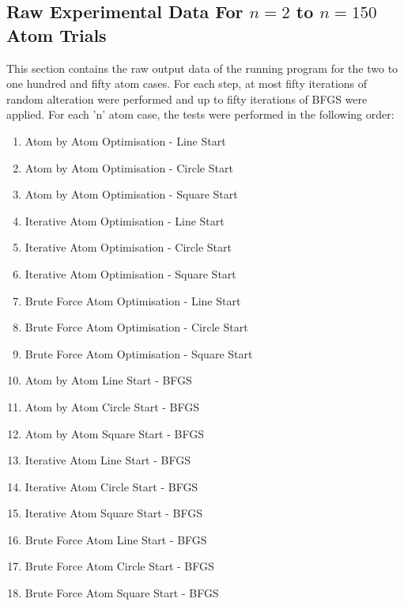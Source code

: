 \documentclass{report}
\begin{document}
\begin{appendix}
\section{Raw Experimental Data For $n = 2$ to $n = 150$ Atom Trials}

This section contains the raw output data of the running program for the 
two to one hundred and fifty atom cases. For each step, at most fifty iterations of 
random alteration were performed and up to fifty iterations of BFGS were applied.
For each 'n' atom case, the tests
were performed in the following order:

\begin{enumerate}
	\item Atom by Atom Optimisation - Line Start
	\item Atom by Atom Optimisation - Circle Start
	\item Atom by Atom Optimisation - Square Start
	
	\item Iterative Atom Optimisation - Line Start
	\item Iterative Atom Optimisation - Circle Start
	\item Iterative Atom Optimisation - Square Start
	
	\item Brute Force Atom Optimisation - Line Start
	\item Brute Force Atom Optimisation - Circle Start
	\item Brute Force Atom Optimisation - Square Start
	
	\item Atom by Atom Line Start - BFGS
	\item Atom by Atom Circle Start - BFGS
	\item Atom by Atom Square Start - BFGS
	
	\item Iterative Atom Line Start - BFGS
	\item Iterative Atom Circle Start - BFGS
	\item Iterative Atom Square Start - BFGS
	
	\item Brute Force Atom Line Start - BFGS
	\item Brute Force Atom Circle Start - BFGS
	\item Brute Force Atom Square Start - BFGS
\end{enumerate}


\end{appendix}
\end{document}

